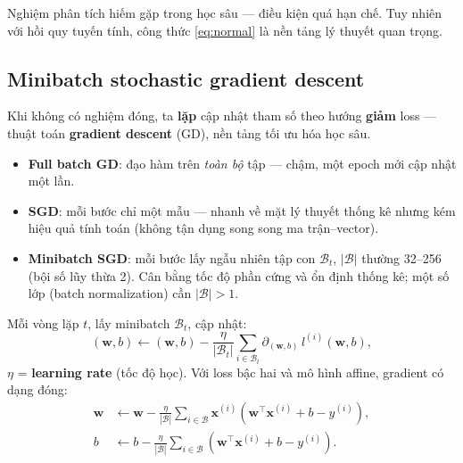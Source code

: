 \documentclass[12pt,a4paper]{article}
\begin{document}
\begin{luuy}[title={Hạn chế nghiệm phân tích}]
Nghiệm phân tích hiếm gặp trong học sâu --- điều kiện quá hạn chế. Tuy nhiên với hồi quy tuyến tính, công thức \eqref{eq:normal} là nền tảng lý thuyết quan trọng.
\end{luuy}

\subsection{Minibatch stochastic gradient descent}

\begin{phuongphap}[title={Gradient descent và biến thể}]
Khi không có nghiệm đóng, ta \textbf{lặp} cập nhật tham số theo hướng \textbf{giảm} loss --- thuật toán \textbf{gradient descent} (GD), nền tảng tối ưu hóa học sâu.

\begin{itemize}
  \item \textbf{Full batch GD}: đạo hàm trên \emph{toàn bộ} tập --- chậm, một epoch mới cập nhật một lần.
  \item \textbf{SGD}: mỗi bước chỉ một mẫu --- nhanh về mặt lý thuyết thống kê nhưng kém hiệu quả tính toán (không tận dụng song song ma trận--vector).
  \item \textbf{Minibatch SGD}: mỗi bước lấy ngẫu nhiên tập con $\mathcal{B}_t$, $|\mathcal{B}|$ thường 32--256 (bội số lũy thừa 2). Cân bằng tốc độ phần cứng và ổn định thống kê; một số lớp (batch normalization) cần $|\mathcal{B}|>1$.
\end{itemize}

Mỗi vòng lặp $t$, lấy minibatch $\mathcal{B}_t$, cập nhật:
\begin{equation}\label{eq:sgd}
  (\mathbf{w}, b) \leftarrow (\mathbf{w}, b)
  - \frac{\eta}{|\mathcal{B}_t|} \sum_{i \in \mathcal{B}_t} \partial_{(\mathbf{w},b)}\, l^{(i)}(\mathbf{w}, b),
\end{equation}
$\eta$ = \textbf{learning rate} (tốc độ học). Với loss bậc hai và mô hình affine, gradient có dạng đóng:
\begin{align}
  \mathbf{w} &\leftarrow \mathbf{w} - \frac{\eta}{|\mathcal{B}|} \sum_{i \in \mathcal{B}}
    \mathbf{x}^{(i)}\left(\mathbf{w}^\top \mathbf{x}^{(i)} + b - y^{(i)}\right), \label{eq:sgd-w}\\
  b &\leftarrow b - \frac{\eta}{|\mathcal{B}|} \sum_{i \in \mathcal{B}}
    \left(\mathbf{w}^\top \mathbf{x}^{(i)} + b - y^{(i)}\right). \label{eq:sgd-b}
\end{align}
\end{phuongphap}
\end{document}
